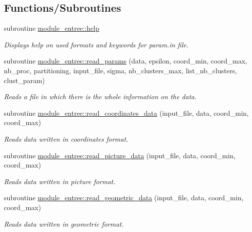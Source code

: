 \subsection*{Functions/\+Subroutines}
\begin{DoxyCompactItemize}
\item 
subroutine \hyperlink{namespacemodule__entree_ae91fc1d896afb27c01d7314dce81db70}{module\+\_\+entree\+::help}
\begin{DoxyCompactList}\small\item\em Displays help on used formats and keywords for {\itshape param.\+in} file. \end{DoxyCompactList}\item 
subroutine \hyperlink{namespacemodule__entree_a4a8eec4484896ca8cb249548e1cf537f}{module\+\_\+entree\+::read\+\_\+params} (data, epsilon, coord\+\_\+min, coord\+\_\+max, nb\+\_\+proc, partitioning, input\+\_\+file, sigma, nb\+\_\+clusters\+\_\+max, list\+\_\+nb\+\_\+clusters, clust\+\_\+param)
\begin{DoxyCompactList}\small\item\em Reads a file in which there is the whole information on the data. \end{DoxyCompactList}\item 
subroutine \hyperlink{namespacemodule__entree_a93d220ea64cd5e1d155255bca188de0c}{module\+\_\+entree\+::read\+\_\+coordinates\+\_\+data} (input\+\_\+file, data, coord\+\_\+min, coord\+\_\+max)
\begin{DoxyCompactList}\small\item\em Reads data written in coordinates format. \end{DoxyCompactList}\item 
subroutine \hyperlink{namespacemodule__entree_aaa0e9ef36218a32292aa65a9b8602cda}{module\+\_\+entree\+::read\+\_\+picture\+\_\+data} (input\+\_\+file, data, coord\+\_\+min, coord\+\_\+max)
\begin{DoxyCompactList}\small\item\em Reads data written in picture format. \end{DoxyCompactList}\item 
subroutine \hyperlink{namespacemodule__entree_ae5047aaa626b5cac3c9f98267f502669}{module\+\_\+entree\+::read\+\_\+geometric\+\_\+data} (input\+\_\+file, data, coord\+\_\+min, coord\+\_\+max)
\begin{DoxyCompactList}\small\item\em Reads data written in geometric format. \end{DoxyCompactList}\item 

\end{DoxyCompactItemize}

